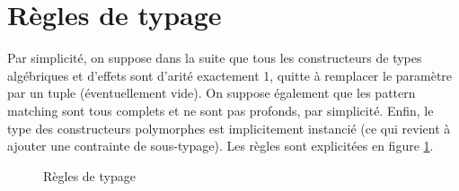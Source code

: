 \documentclass[a4paper,10pt]{article}
\begin{document}
\section{Règles de typage}

Par simplicité, on suppose dans la suite que tous les constructeurs de types algébriques et d'effets sont d'arité exactement 1, quitte à remplacer le paramètre par un tuple (éventuellement vide). On suppose également que les pattern matching sont tous complets et ne sont pas profonds, par simplicité. Enfin, le type des constructeurs polymorphes est implicitement instancié (ce qui revient à ajouter une contrainte de sous-typage). Les règles sont explicitées en figure \ref{fig:typage}.

\renewcommand{\DefTirName}{\LeftTirName}

\begin{figure}
  \caption{Règles de typage\label{fig:typage}}
\end{figure}
\end{document}
